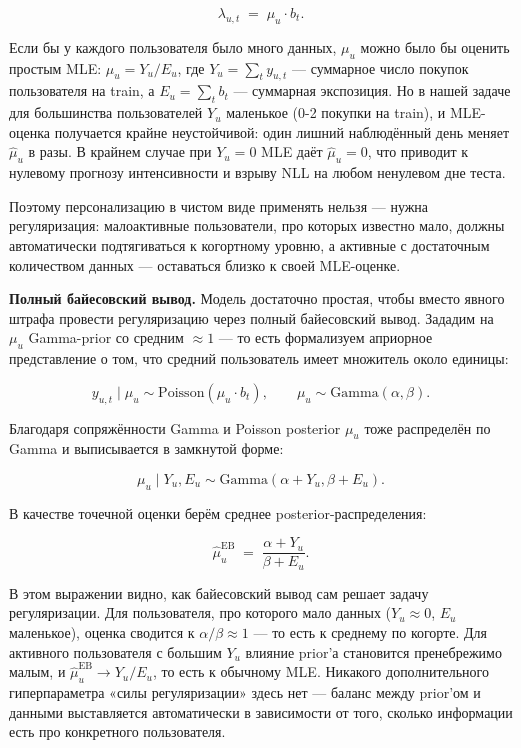 \documentclass[12pt,a4paper]{article}
\begin{document}
\[
\lambda_{u,t} \;=\; \mu_u \cdot b_t.
\]

Если бы у каждого пользователя было много данных, $\mu _u$ можно было бы оценить простым MLE: $\hat\mu _u = Y_u / E_u$, где $Y_u = \sum_t y_{u,t}$ --- суммарное число покупок пользователя на train, а $E_u = \sum_t b_t$ --- суммарная экспозиция. Но в нашей задаче для большинства пользователей $Y_u$ маленькое (0-2 покупки на train), и MLE-оценка получается крайне неустойчивой: один лишний наблюдённый день меняет $\hat\mu _u$ в разы. В крайнем случае при $Y_u = 0$ MLE даёт $\hat\mu _u = 0$, что приводит к нулевому прогнозу интенсивности и взрыву NLL на любом ненулевом дне теста.

Поэтому персонализацию в чистом виде применять нельзя --- нужна регуляризация: малоактивные пользователи, про которых известно мало, должны автоматически подтягиваться к когортному уровню, а активные с достаточным количеством данных --- оставаться близко к своей MLE-оценке.

\textbf{Полный байесовский вывод.} Модель достаточно простая, чтобы вместо явного штрафа провести регуляризацию через полный байесовский вывод. Зададим на $\mu _u$ Gamma-prior со средним $\approx 1$ --- то есть формализуем априорное представление о том, что средний пользователь имеет множитель около единицы:

\[
y_{u,t} \mid \mu_u \sim \mathrm{Poisson}(\mu_u \cdot b_t), \qquad \mu_u \sim \mathrm{Gamma}(\alpha, \beta).
\]

Благодаря сопряжённости Gamma и Poisson posterior $\mu _u$ тоже распределён по Gamma и выписывается в замкнутой форме:

\[
\mu_u \mid Y_u, E_u \sim \mathrm{Gamma}(\alpha + Y_u, \beta + E_u).
\]

В качестве точечной оценки берём среднее posterior-распределения:

\[
\hat\mu_u^{\mathrm{EB}} \;=\; \frac{\alpha + Y_u}{\beta + E_u}.
\]

В этом выражении видно, как байесовский вывод сам решает задачу регуляризации. Для пользователя, про которого мало данных ($Y_u \approx 0$, $E_u$ маленькое), оценка сводится к $\alpha / \beta \approx 1$ --- то есть к среднему по когорте. Для активного пользователя с большим $Y_u$ влияние prior'а становится пренебрежимо малым, и $\hat\mu _u^{\mathrm{EB}} \to Y_u / E_u$, то есть к обычному MLE. Никакого дополнительного гиперпараметра «силы регуляризации» здесь нет --- баланс между prior'ом и данными выставляется автоматически в зависимости от того, сколько информации есть про конкретного пользователя.
\end{document}
